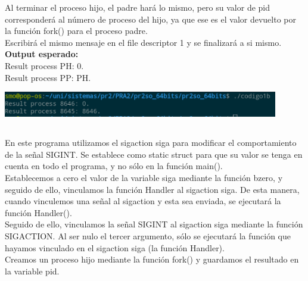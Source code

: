 \documentclass[spanish]{article}
\begin{document}
Al terminar el proceso hijo, el padre hará lo mismo, pero su
valor de pid corresponderá al número de proceso del hijo, ya
que ese es el valor devuelto por la función fork() para el
proceso padre.\\

Escribirá el mismo mensaje en el file descriptor 1 y se
finalizará a si mismo.\\

\textbf{Output esperado:}\\

Result process PH: 0.\\

Result process PP: PH.\\

\begin{center}
\includegraphics[width=12cm]{../img/2.png}
\end{center}

\subsection{}

\subsubsection{}

En este programa utilizamos el sigaction siga para modificar
el comportamiento de la señal SIGINT. Se establece como
static struct para que su valor se tenga en cuenta en todo
el programa, y no sólo en la función main().\\

Establecemos a cero el valor de la variable siga mediante la
función bzero, y seguido de ello, vinculamos la función
Handler al sigaction siga. De esta manera, cuando vinculemos
una señal al sigaction y esta sea enviada, se ejecutará la
función Handler().\\

Seguido de ello, vinculamos la señal SIGINT al sigaction
siga mediante la función SIGACTION. Al ser nulo el tercer
argumento, sólo se ejecutará la función que hayamos
vinculado en el sigaction siga (la función Handler).\\

Creamos un proceso hijo mediante la función fork() y
guardamos el resultado en la variable pid.\\
\end{document}
